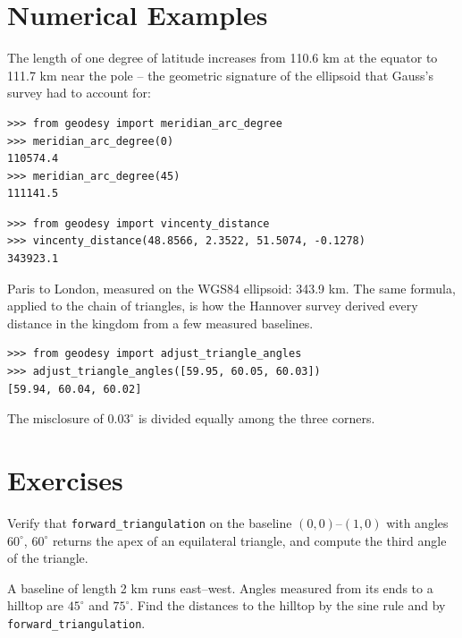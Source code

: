 \section{Numerical Examples}

\begin{example}
The length of one degree of latitude increases from 110.6 km at the equator to 111.7 km near the pole -- the geometric signature of the ellipsoid that Gauss's survey had to account for:
\begin{lstlisting}[style=python]
>>> from geodesy import meridian_arc_degree
>>> meridian_arc_degree(0)
110574.4
>>> meridian_arc_degree(45)
111141.5
\end{lstlisting}
\end{example}

\begin{example}
\begin{lstlisting}[style=python]
>>> from geodesy import vincenty_distance
>>> vincenty_distance(48.8566, 2.3522, 51.5074, -0.1278)
343923.1
\end{lstlisting}
Paris to London, measured on the WGS84 ellipsoid: 343.9 km. The same formula, applied to the chain of triangles, is how the Hannover survey derived every distance in the kingdom from a few measured baselines.
\end{example}

\begin{example}
\begin{lstlisting}[style=python]
>>> from geodesy import adjust_triangle_angles
>>> adjust_triangle_angles([59.95, 60.05, 60.03])
[59.94, 60.04, 60.02]
\end{lstlisting}
The misclosure of $0.03^\circ$ is divided equally among the three corners.
\end{example}

\section{Exercises}

\begin{exercise}
Verify that \texttt{forward\_triangulation} on the baseline $(0,0)$--$(1,0)$ with angles $60^\circ$, $60^\circ$ returns the apex of an equilateral triangle, and compute the third angle of the triangle.
\end{exercise}

\begin{exercise}
A baseline of length 2 km runs east--west. Angles measured from its ends to a hilltop are $45^\circ$ and $75^\circ$. Find the distances to the hilltop by the sine rule and by \texttt{forward\_triangulation}.
\end{exercise}

